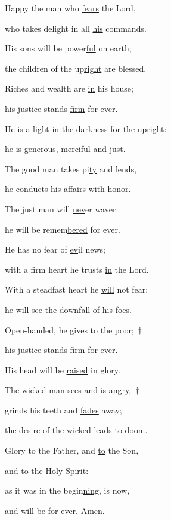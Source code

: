 \noindent Happy the man who \uline{fears} the Lord,~\GreStar{}~\nopagebreak

who takes delight in all \uline{his} commands.

\noindent His sons will be power\uline{ful} on earth;~\GreStar{}~\nopagebreak

the children of the up\uline{right} are blessed.

\noindent Riches and wealth are \uline{in} his house;~\GreStar{}~\nopagebreak

his justice stands \uline{firm} for ever.

\noindent He is a light in the darkness \uline{for} the upright:~\GreStar{}~\nopagebreak

he is generous, merci\uline{ful} and just.

\noindent The good man takes pi\uline{ty} and lends,~\GreStar{}~\nopagebreak

he conducts his af\uline{fairs} with honor.

\noindent The just man will \uline{nev}er waver:~\GreStar{}~\nopagebreak

he will be remem\uline{bered} for ever.

\noindent He has no fear of \uline{ev}il news;~\GreStar{}~\nopagebreak

with a firm heart he trusts \uline{in} the Lord.

\noindent With a steadfast heart he \uline{will} not fear;~\GreStar{}~\nopagebreak

he will see the downfall \uline{of} his foes.

\noindent Open-handed, he gives to the \uline{poor;}~†~\nopagebreak

his justice stands \uline{firm} for ever.~\GreStar{}~\nopagebreak

His head will be \uline{raised} in glory.

\noindent The wicked man sees and is \uline{angry,}~†~\nopagebreak

grinds his teeth and \uline{fades} away;~\GreStar{}~\nopagebreak

the desire of the wicked \uline{leads} to doom.

\noindent Glory to the Father, and \uline{to} the Son,~\GreStar{}~\nopagebreak

and to the \uline{Ho}ly Spirit:

\noindent as it was in the begin\uline{ning}, is now,~\GreStar{}~\nopagebreak

and will be for ev\uline{er}. Amen.
